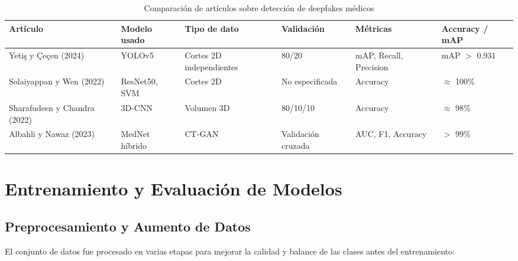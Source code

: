 \documentclass[conference]{IEEEtran}
\begin{document}
\begin{table}[ht]
\centering
\caption{Comparación de artículos sobre detección de deepfakes médicos}
\begin{tabular}{p{1.3cm} p{1cm} p{1cm} p{1.2cm} p{1cm} p{1cm}}
\toprule
\textbf{Artículo} & \textbf{Modelo usado} & \textbf{Tipo de dato} & \textbf{Validación} & \textbf{Métricas} & \textbf{Accuracy / mAP} \\
\midrule
Yetiş y Çeçen (2024) & YOLOv5 & Cortes 2D independientes & 80/20 & mAP, Recall, Precision & mAP $>$ 0.931 \\
\midrule
Solaiyappan y Wen (2022) & ResNet50, SVM & Cortes 2D & No especificada & Accuracy & $\approx$ 100\% \\
\midrule
Sharafudeen y Chandra (2022) & 3D-CNN & Volumen 3D & 80/10/10 & Accuracy & $\approx$ 98\% \\
\midrule
Albahli y Nawaz (2023) & MedNet híbrido & CT-GAN & Validación cruzada & AUC, F1, Accuracy & $>$ 99\% \\
\bottomrule
\end{tabular}
\label{tab:comparacion-articulos}
\end{table}





\section{Entrenamiento y Evaluación de Modelos}

\subsection{Preprocesamiento y Aumento de Datos}

El conjunto de datos fue procesado en varias etapas para mejorar la calidad y balance de las clases antes del entrenamiento:
\end{document}
